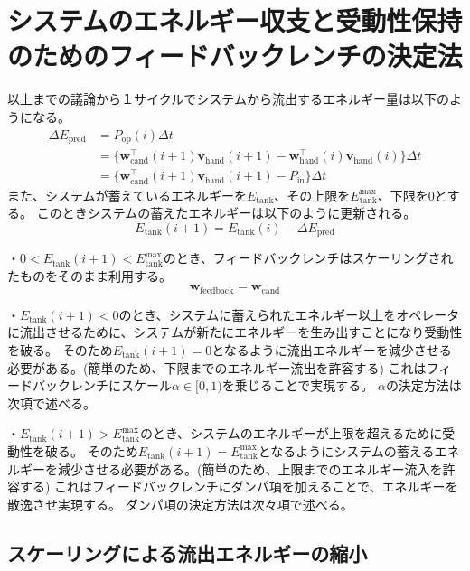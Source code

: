 \documentclass[uplatex]{jsarticle}
\begin{document}
\section{システムのエネルギー収支と受動性保持のためのフィードバックレンチの決定法}
以上までの議論から１サイクルでシステムから流出するエネルギー量は以下のようになる。
\begin{equation}
\begin{split}
  \Delta E_{\text{pred}} &= P_{\text{op}}(i) \Delta t \\
  &= \{ \bm{w}_{\text{cand}}^\top(i+1) \bm{v}_{\text{hand}}(i+1) - \bm{w}_{\text{hand}}^\top(i) \bm{v}_{\text{hand}}(i) \} \Delta t \\
  &= \{ \bm{w}_{\text{cand}}^\top(i+1) \bm{v}_{\text{hand}}(i+1) - P_{\text{in}} \} \Delta t
\end{split}
\end{equation}
また、システムが蓄えているエネルギーを$E_{\text{tank}}$、その上限を$E_{\text{tank}}^{\text{max}}$、下限を$0$とする。
このときシステムの蓄えたエネルギーは以下のように更新される。
\begin{equation}
  E_{\text{tank}}(i+1) = E_{\text{tank}}(i) - \Delta E_{\text{pred}}
\end{equation}

・$0 < E_{\text{tank}}(i+1) < E_{\text{tank}}^{\text{max}}$のとき、フィードバックレンチはスケーリングされたものをそのまま利用する。
\begin{equation}
  \bm{w}_{\text{feedback}} = \bm{w}_{\text{cand}}
\end{equation}

・$E_{\text{tank}}(i+1) < 0$のとき、システムに蓄えられたエネルギー以上をオペレータに流出させるために、システムが新たにエネルギーを生み出すことになり受動性を破る。
そのため$E_{\text{tank}}(i+1) = 0$となるように流出エネルギーを減少させる必要がある。(簡単のため、下限までのエネルギー流出を許容する)
これはフィードバックレンチにスケール$\alpha \in [0,1)$を乗じることで実現する。
$\alpha$の決定方法は次項で述べる。

・$E_{\text{tank}}(i+1) > E_{\text{tank}}^{\text{max}}$のとき、システムのエネルギーが上限を超えるために受動性を破る。
そのため$E_{\text{tank}}(i+1) = E_{\text{tank}}^{\text{max}}$となるようにシステムの蓄えるエネルギーを減少させる必要がある。(簡単のため、上限までのエネルギー流入を許容する)
これはフィードバックレンチにダンパ項を加えることで、エネルギーを散逸させ実現する。
ダンパ項の決定方法は次々項で述べる。

\subsection{スケーリングによる流出エネルギーの縮小}
\end{document}
